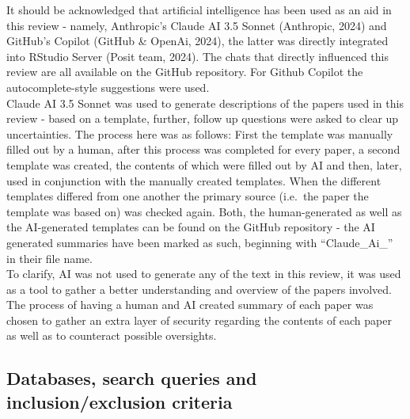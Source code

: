 \documentclass[
  stu]{apa7}
\begin{document}
It should be acknowledged that artificial intelligence has been used as an aid in this review - namely, Anthropic's Claude AI 3.5 Sonnet (Anthropic, 2024) and GitHub's Copilot (GitHub \& OpenAi, 2024), the latter was directly integrated into RStudio Server (Posit team, 2024). The chats that directly influenced this review are all available on the GitHub repository.
For Github Copilot the autocomplete-style suggestions were used.\\
Claude AI 3.5 Sonnet was used to generate descriptions of the papers used in this review - based on a template, further, follow up questions were asked to clear up uncertainties.
The process here was as follows: First the template was manually filled out by a human, after this process was completed for every paper, a second template was created, the contents of which were filled out by AI and then, later, used in conjunction with the manually created templates. When the different templates differed from one another the primary source (i.e.~the paper the template was based on) was checked again. Both, the human-generated as well as the AI-generated templates can be found on the GitHub repository - the AI generated summaries have been marked as such, beginning with ``Claude\_Ai\_'' in their file name.\\
To clarify, AI was not used to generate any of the text in this review, it was used as a tool to gather a better understanding and overview of the papers involved. The process of having a human and AI created summary of each paper was chosen to gather an extra layer of security regarding the contents of each paper as well as to counteract possible oversights.

\subsection{Databases, search queries and inclusion/exclusion criteria}\label{databases-search-queries-and-inclusionexclusion-criteria}
\end{document}
